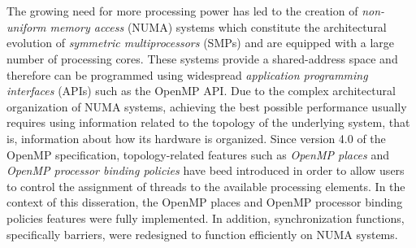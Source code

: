 \chapter*{\csebilabstract}
\addstarredchapter{\csebilabstract} %
\makecsebilabstract

\noindent The growing need for more processing power has led to the creation of \textit{non-uniform memory access} (NUMA) systems which constitute the architectural evolution of \textit{symmetric multiprocessors} (SMPs) and are equipped with a large number of processing cores. These systems provide a shared-address space and therefore can be programmed %
using widespread \textit{application programming interfaces} (APIs) such as the OpenMP API. Due to the complex architectural organization of NUMA systems, achieving the best possible performance usually requires using information related to the topology of the underlying system, that is, information about how its hardware is organized. Since version 4.0 of the OpenMP specification, topology-related features such as \textit{OpenMP places} and \textit{OpenMP processor binding policies} have beed introduced in order to allow users to control the assignment of threads to the available processing elements. In the context of this disseration, the OpenMP places and OpenMP processor binding policies features were fully implemented. In addition, synchronization functions, specifically barriers, were redesigned to function efficiently on NUMA systems.

\bigskip
